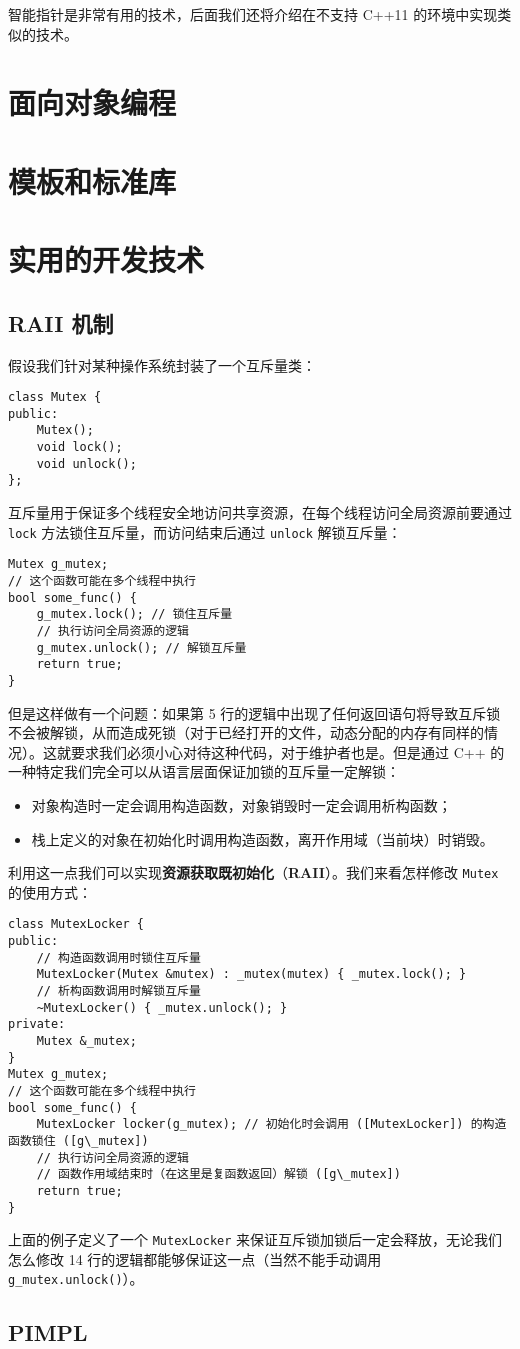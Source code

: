 \documentclass[hyperref,UTF8]{article}
\begin{document}
智能指针是非常有用的技术，后面我们还将介绍在不支持 C++11 的环境中实现类似的技术。

\section{面向对象编程}

\section{模板和标准库}

\section{实用的开发技术}

\subsection{RAII 机制}

假设我们针对某种操作系统封装了一个互斥量类：
\begin{lstlisting}
class Mutex {
public:
    Mutex();
    void lock();
    void unlock();
};
\end{lstlisting}
互斥量用于保证多个线程安全地访问共享资源，在每个线程访问全局资源前要通过 \texttt{lock} 方法锁住互斥量，而访问结束后通过 \texttt{unlock} 解锁互斥量：
\begin{lstlisting}
Mutex g_mutex;
// 这个函数可能在多个线程中执行
bool some_func() {
    g_mutex.lock(); // 锁住互斥量
    // 执行访问全局资源的逻辑
    g_mutex.unlock(); // 解锁互斥量
    return true;
}
\end{lstlisting}
但是这样做有一个问题：如果第 5 行的逻辑中出现了任何返回语句将导致互斥锁不会被解锁，从而造成死锁（对于已经打开的文件，动态分配的内存有同样的情况）。这就要求我们必须小心对待这种代码，对于维护者也是。但是通过 C++ 的一种特定我们完全可以从语言层面保证加锁的互斥量一定解锁：
\begin{itemize}
  \item 对象构造时一定会调用构造函数，对象销毁时一定会调用析构函数；
  \item 栈上定义的对象在初始化时调用构造函数，离开作用域（当前块）时销毁。
\end{itemize}
利用这一点我们可以实现\textbf{资源获取既初始化}（\textbf{RAII}）。我们来看怎样修改 \texttt{Mutex} 的使用方式：
\begin{lstlisting}
class MutexLocker {
public:
    // 构造函数调用时锁住互斥量
    MutexLocker(Mutex &mutex) : _mutex(mutex) { _mutex.lock(); }
    // 析构函数调用时解锁互斥量
    ~MutexLocker() { _mutex.unlock(); }
private:
    Mutex &_mutex;
}
Mutex g_mutex;
// 这个函数可能在多个线程中执行
bool some_func() {
    MutexLocker locker(g_mutex); // 初始化时会调用 ([MutexLocker]) 的构造函数锁住 ([g\_mutex])
    // 执行访问全局资源的逻辑
    // 函数作用域结束时（在这里是复函数返回）解锁 ([g\_mutex])
    return true;
}
\end{lstlisting}
上面的例子定义了一个 \texttt{MutexLocker} 来保证互斥锁加锁后一定会释放，无论我们怎么修改 14 行的逻辑都能够保证这一点（当然不能手动调用 \texttt{g\_mutex.unlock()}）。

\subsection{PIMPL}


\end{document}
